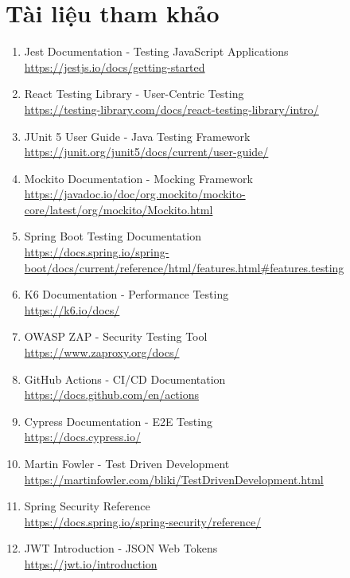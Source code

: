 \section{Tài liệu tham khảo}

\begin{enumerate}
    \item Jest Documentation - Testing JavaScript Applications \\
    \url{https://jestjs.io/docs/getting-started}
    
    \item React Testing Library - User-Centric Testing \\
    \url{https://testing-library.com/docs/react-testing-library/intro/}
    
    \item JUnit 5 User Guide - Java Testing Framework \\
    \url{https://junit.org/junit5/docs/current/user-guide/}
    
    \item Mockito Documentation - Mocking Framework \\
    \url{https://javadoc.io/doc/org.mockito/mockito-core/latest/org/mockito/Mockito.html}
    
    \item Spring Boot Testing Documentation \\
    \url{https://docs.spring.io/spring-boot/docs/current/reference/html/features.html#features.testing}
    
    \item K6 Documentation - Performance Testing \\
    \url{https://k6.io/docs/}
    
    \item OWASP ZAP - Security Testing Tool \\
    \url{https://www.zaproxy.org/docs/}
    
    \item GitHub Actions - CI/CD Documentation \\
    \url{https://docs.github.com/en/actions}
    
    \item Cypress Documentation - E2E Testing \\
    \url{https://docs.cypress.io/}
    
    \item Martin Fowler - Test Driven Development \\
    \url{https://martinfowler.com/bliki/TestDrivenDevelopment.html}
    
    \item Spring Security Reference \\
    \url{https://docs.spring.io/spring-security/reference/}
    
    \item JWT Introduction - JSON Web Tokens \\
    \url{https://jwt.io/introduction}
    
\end{enumerate}
